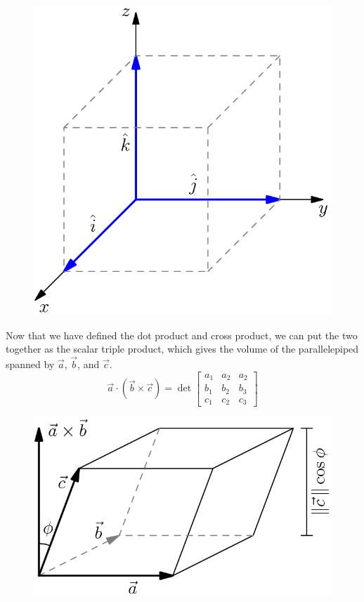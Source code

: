 \begin{figure}[H]
	\centering
	\includegraphics[scale=0.33]{Images/backgroundReview/UnitVectors}
\end{figure}




\noindent
Now that we have defined the dot product and cross product, we can put the two together as the scalar triple product, which gives the volume of the parallelepiped spanned by $\vec{a}$, $\vec{b}$, and $\vec{c}$.\\
\begin{equation*}
	\vec{a}\cdot\left(\vec{b}\times\vec{c}\right) = \det\begin{bmatrix}
		a_1 & a_2 & a_2 \\
		b_1 & b_2 & b_3 \\
		c_1 & c_2 & c_3
	\end{bmatrix}
\end{equation*}

\begin{figure}[H]
	\centering
	\includegraphics[scale=0.33]{Images/backgroundReview/Parallelipiped}
\end{figure}
